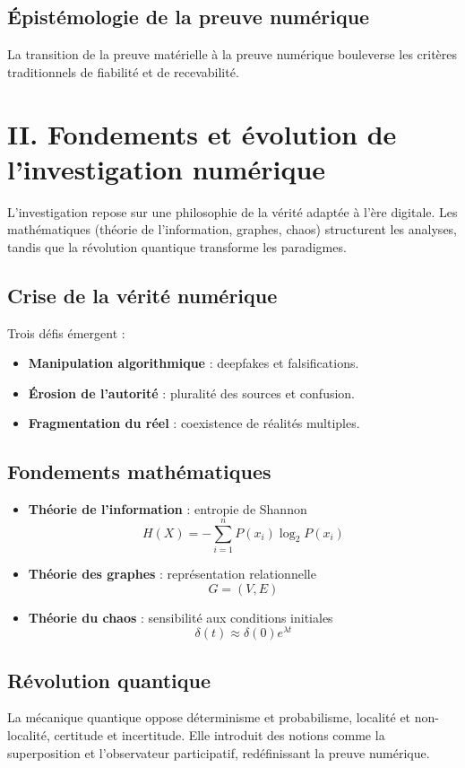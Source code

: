 \documentclass[a4paper,12pt]{article}
\begin{document}
\subsection{Épistémologie de la preuve numérique}
La transition de la preuve matérielle à la preuve numérique bouleverse les critères 
traditionnels de fiabilité et de recevabilité.

\section{II. Fondements et évolution de l’investigation numérique}
L’investigation repose sur une philosophie de la vérité adaptée à l’ère digitale. 
Les mathématiques (théorie de l’information, graphes, chaos) structurent les analyses, 
tandis que la révolution quantique transforme les paradigmes.

\subsection{Crise de la vérité numérique}
Trois défis émergent :
\begin{itemize}
\item \textbf{Manipulation algorithmique} : deepfakes et falsifications.
\item \textbf{Érosion de l’autorité} : pluralité des sources et confusion.
\item \textbf{Fragmentation du réel} : coexistence de réalités multiples.
\end{itemize}

\subsection{Fondements mathématiques}
\begin{itemize}
\item \textbf{Théorie de l’information} : entropie de Shannon
\[ H(X) = -\sum_{i=1}^{n} P(x_i) \log_2 P(x_i) \]
\item \textbf{Théorie des graphes} : représentation relationnelle
\[ G = (V, E) \]
\item \textbf{Théorie du chaos} : sensibilité aux conditions initiales
\[ \delta(t) \approx \delta(0)e^{\lambda t} \]
\end{itemize}

\subsection{Révolution quantique}
La mécanique quantique oppose déterminisme et probabilisme, localité et non-localité, 
certitude et incertitude. Elle introduit des notions comme la superposition et 
l’observateur participatif, redéfinissant la preuve numérique.
\end{document}
